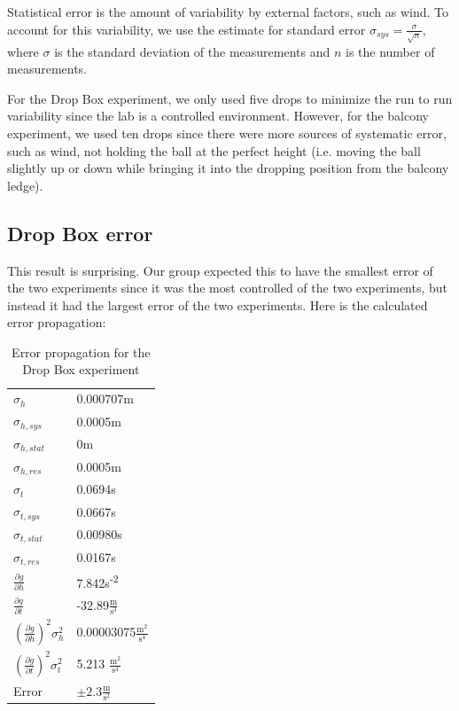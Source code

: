 \documentclass[12pt]{article}
\begin{document}
Statistical error is the amount of variability by external factors, such as wind. To account for this variability, we use the estimate for standard error \(\sigma_{sys} = \frac{\sigma}{\sqrt{n}}\), where \(\sigma\) is the standard deviation of the measurements and \(n\) is the number of measurements.

For the Drop Box experiment, we only used five drops to minimize the run to run variability since the lab is a controlled environment. However, for the balcony experiment, we used ten drops since there were more sources of systematic error, such as wind, not holding the ball at the perfect height (i.e. moving the ball slightly up or down while bringing it into the dropping position from the balcony ledge).
\subsection{Drop Box error}
\label{sec:orgbb7864e}

This result is surprising. Our group expected this to have the smallest error of the two experiments since it was the most controlled of the two experiments, but instead it had the largest error of the two experiments. Here is the calculated error propagation:

\begin{table}[htbp]
\caption{\label{dropbox-error}Error propagation for the Drop Box experiment}
\centering
\begin{tabular}{l|l}
\hline
\(\sigma_h\) & 0.000707m\\
\(\sigma_{h,sys}\) & 0.0005m\\
\(\sigma_{h,stat}\) & 0m\\
\(\sigma_{h,res}\) & 0.0005m\\
\hline
\(\sigma_t\) & 0.0694s\\
\(\sigma_{t,sys}\) & 0.0667s\\
\(\sigma_{t,stat}\) & 0.00980s\\
\(\sigma_{t,res}\) & 0.0167s\\
\hline
\(\frac{\partial g}{\partial h}\) & 7.842s\textsuperscript{-2}\\
\(\frac{\partial g}{\partial t}\) & -32.89\(\frac{\text{m}}{\text{s}^{3}}\)\\
\hline
\(\left(\frac{\partial g}{\partial h}\right)^{2}\sigma_{h}^2\) & 0.00003075\(\frac{\text{m}^{2}}{\text{s}^{4}}\)\\
\(\left(\frac{\partial g}{\partial t}\right)^{2}\sigma_{t}^2\) & 5.213 \(\frac{\text{m}^{2}}{\text{s}^4}\)\\
\hline
Error & \(\pm 2.3 \frac{\text{m}}{\text{s}^{2}}\)\\
\end{tabular}
\end{table}
\end{document}
